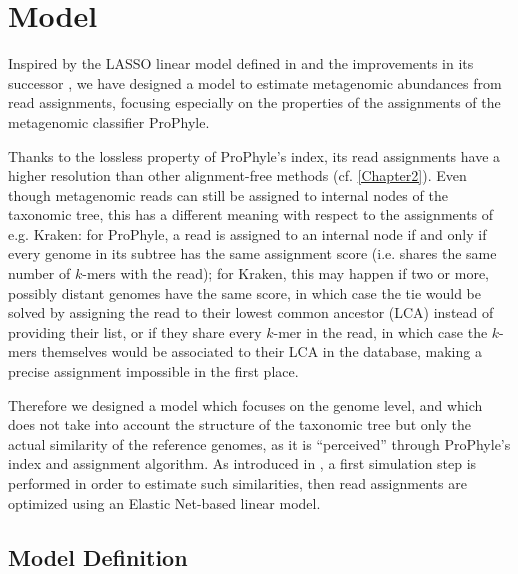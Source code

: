 
\section{Model}

Inspired by the LASSO linear model defined in \cite{lindner_metagenomic_2013} and the improvements in its successor \cite{fischer_abundance_2017}, we have designed a model to estimate metagenomic abundances from read assignments, focusing especially on the properties of the assignments of the metagenomic classifier ProPhyle.

Thanks to the lossless property of ProPhyle's index, its read assignments have a higher resolution than other alignment-free methods (cf. \ref{Chapter2}). Even though metagenomic reads can still be assigned to internal nodes of the taxonomic tree, this has a different meaning with respect to the assignments of e.g. Kraken: for ProPhyle, a read is assigned to an internal node if and only if every genome in its subtree has the same assignment score (i.e. shares the same number of $k$-mers with the read); for Kraken, this may happen if two or more, possibly distant genomes have the same score, in which case the tie would be solved by assigning the read to their lowest common ancestor (LCA) instead of providing their list, or if they share every $k$-mer in the read, in which case the $k$-mers themselves would be associated to their LCA in the database, making a precise assignment impossible in the first place.

Therefore we designed a model which focuses on the genome level, and which does not take into account the structure of the taxonomic tree but only the actual similarity of the reference genomes, as it is ``perceived'' through ProPhyle's index and assignment algorithm. As introduced in \cite{lindner_metagenomic_2013}, a first simulation step is performed in order to estimate such similarities, then read assignments are optimized using an Elastic Net-based linear model.

\subsection{Model Definition}

